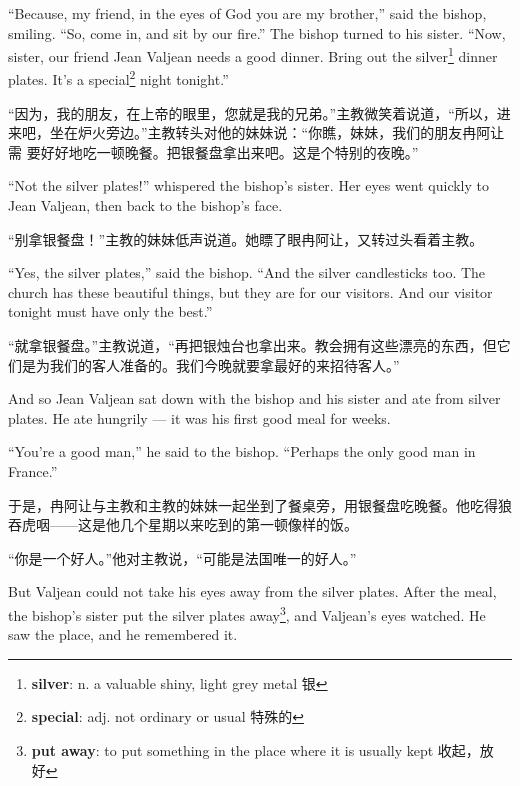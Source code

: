 \documentclass[fontset=ubuntu, zihao=5]{ctexart}
\begin{document}
\begin{paracol}{2}
  ``Because, my friend, in the eyes of God you are my brother,'' said the
  bishop, smiling. ``So, come in, and sit by our fire.'' The bishop turned to
  his sister. ``Now, sister, our friend Jean Valjean needs a good dinner. Bring
  out the silver\footnote{\textbf{silver}: n. a valuable shiny, light grey
    metal 银} dinner plates. It's a special\footnote{\textbf{special}: adj. not ordinary or usual 特殊的} night tonight.''

  \switchcolumn

  “因为，我的朋友，在上帝的眼里，您就是我的兄弟。”主教微笑着说道，“所以，进
  来吧，坐在炉火旁边。”主教转头对他的妹妹说：“你瞧，妹妹，我们的朋友冉阿让需
  要好好地吃一顿晚餐。把银餐盘拿出来吧。这是个特别的夜晚。”

  \switchcolumn*

  ``Not the silver plates!'' whispered the bishop's sister. Her eyes went quickly to Jean Valjean, then back to the bishop's face.

  \switchcolumn

  “别拿银餐盘！”主教的妹妹低声说道。她瞟了眼冉阿让，又转过头看着主教。

  \switchcolumn*

  ``Yes, the silver plates,'' said the bishop. ``And the silver candlesticks
  too. The church has these beautiful things, but they are for our visitors.
  And our visitor tonight must have only the best.''

  \switchcolumn
  “就拿银餐盘。”主教说道，“再把银烛台也拿出来。教会拥有这些漂亮的东西，但它们是为我们的客人准备的。我们今晚就要拿最好的来招待客人。”

  \switchcolumn*

  And so Jean Valjean sat down with the bishop and his sister and ate from
  silver plates. He ate hungrily --- it was his first good meal for weeks.

  ``You're a good man,'' he said to the bishop. ``Perhaps the only good man in France.''

  \switchcolumn
  于是，冉阿让与主教和主教的妹妹一起坐到了餐桌旁，用银餐盘吃晚餐。他吃得狼吞虎咽——这是他几个星期以来吃到的第一顿像样的饭。

  “你是一个好人。”他对主教说，“可能是法国唯一的好人。”

  \switchcolumn*

  But Valjean could not take his eyes away from the silver plates. After the
  meal, the bishop's sister put the silver plates away\footnote{\textbf{put
      away}: to put something in the place where it is usually kept 收起，放
    好}, and Valjean's eyes watched. He saw the place, and he remembered it.



\end{paracol}
\end{document}
